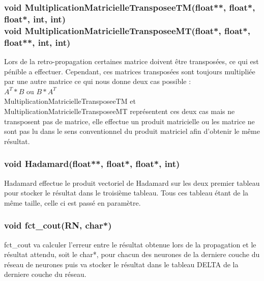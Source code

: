\documentclass{article}
\begin{document}
			\subsubsection{\textcolor{myblue}{\textbf{void}} MultiplicationMatricielleTransposeeTM(\textcolor{myblue}{\textbf{float**}},  \textcolor{myblue}{\textbf{float*}},  \textcolor{myblue}{\textbf{float*}},  \textcolor{myblue}{\textbf{int}},  \textcolor{myblue}{\textbf{int}})\\
			\textcolor{myblue}{\textbf{void}} MultiplicationMatricielleTransposeeMT(\textcolor{myblue}{\textbf{float*}},  \textcolor{myblue}{\textbf{float*}},  \textcolor{myblue}{\textbf{float**}},  \textcolor{myblue}{\textbf{int}},  \textcolor{myblue}{\textbf{int}})}
				Lors de la retro-propagation certaines matrice doivent être transposées, ce qui est pénible a effectuer. Cependant, ces matrices transposées sont toujours multipliée par une autre matrice ce qui nous donne deux cas possible : \\$A^T*B$ ou $B*A^T$\\MultiplicationMatricielleTransposeeTM et MultiplicationMatricielleTransposeeMT représentent ces deux cas mais ne transposent pas de matrice, elle effectue un produit matricielle ou les matrice ne sont pas lu dans le sens conventionnel du produit matriciel afin d'obtenir le même résultat.
				
			\subsubsection{\textcolor{myblue}{\textbf{void}} Hadamard(\textcolor{myblue}{\textbf{float**}},  \textcolor{myblue}{\textbf{float*}},  \textcolor{myblue}{\textbf{float*}},  \textcolor{myblue}{\textbf{int}})}
				Hadamard effectue le produit vectoriel de Hadamard sur les deux premier tableau pour stocker le résultat dans le troisième tableau. Tous ces tableau étant de la même taille, celle ci est passé en paramètre.
				
			\subsubsection{\textcolor{myblue}{\textbf{void}} fct\_cout(\textcolor{myblue}{\textbf{RN}}, \textcolor{myblue}{\textbf{char*}})}
			 fct\_cout va calculer l'erreur entre le résultat obtenue lors de la propagation et le résultat attendu, soit le char*, pour chacun des neurones de la derniere couche du réseau de neurones puis va stocker le résultat dans le tableau DELTA de la derniere couche du réseau.
			
\end{document}
